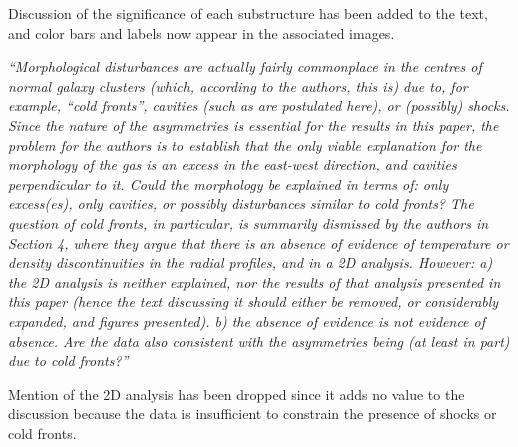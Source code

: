 \documentclass[11pt]{article}
\begin{document}
Discussion of the significance of each substructure has been added to
the text, and color bars and labels now appear in the associated
images.

\hrulefill

{\it{``Morphological disturbances are actually fairly commonplace in
    the centres of normal galaxy clusters (which, according to the
    authors, this is) due to, for example, ``cold fronts'', cavities
    (such as are postulated here), or (possibly) shocks. Since the
    nature of the asymmetries is essential for the results in this
    paper, the problem for the authors is to establish that the only
    viable explanation for the morphology of the gas is an excess in
    the east-west direction, and cavities perpendicular to it. Could
    the morphology be explained in terms of: only excess(es), only
    cavities, or possibly disturbances similar to cold fronts?  The
    question of cold fronts, in particular, is summarily dismissed by
    the authors in Section 4, where they argue that there is an
    absence of evidence of temperature or density discontinuities in
    the radial profiles, and in a 2D analysis.  However: a) the 2D
    analysis is neither explained, nor the results of that analysis
    presented in this paper (hence the text discussing it should
    either be removed, or considerably expanded, and figures
    presented). b) the absence of evidence is not evidence of
    absence. Are the data also consistent with the asymmetries being
    (at least in part) due to cold fronts?''}}

Mention of the 2D analysis has been dropped since it adds no value to
the discussion because the data is insufficient to constrain the
presence of shocks or cold fronts.

\hrulefill
\end{document}
